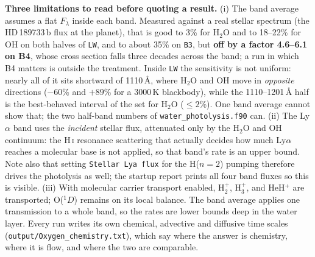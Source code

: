 \documentclass[english,a4paper]{my_memo}
\begin{document}
\textbf{Three limitations to read before quoting a result.} (i) The band
average assumes a flat $F_\lambda$ inside each band. Measured against a real
stellar spectrum (the HD\,189733\,b flux at the planet), that is good to 3\% for
H$_2$O and to 18--22\% for OH on both halves of \texttt{LW}, and to about 35\%
on \texttt{B3}, but \textbf{off by a factor 4.6--6.1 on B4}, whose cross section
falls three decades across the band; a run in which B4 matters is outside the
treatment. Inside \texttt{LW} the sensitivity is not uniform: nearly all of it
sits shortward of 1110\,\AA, where H$_2$O and OH move in \emph{opposite}
directions ($-60$\% and $+89$\% for a 3000\,K blackbody), while the
1110--1201\,\AA{} half is the best-behaved interval of the set for H$_2$O
($\le 2$\%). One band average cannot show that; the two half-band numbers of
\texttt{water\_photolysis.f90} can. (ii) The Ly$\alpha$ band uses the \emph{incident} stellar flux,
attenuated only by the H$_2$O and OH continuum: the H\,\textsc{i} resonance
scattering that actually decides how much Ly$\alpha$ reaches a molecular base is
not applied, so that band's rate is an upper bound. Note also that setting
\texttt{Stellar Lya flux} for the H($n{=}2$) pumping therefore drives the
photolysis as well; the startup report prints all four band fluxes so this is
visible. (iii) With molecular carrier transport enabled, H$_2^+$, H$_3^+$,
and HeH$^+$ are transported; O($^1D$) remains on its local balance. The band average
applies one transmission to a whole band, so the rates are lower bounds deep in
the water layer. Every run writes its own chemical, advective and diffusive time
scales (\texttt{output/Oxygen\_chemistry.txt}), which say where the answer is
chemistry, where it is flow, and where the two are comparable.
\end{document}
